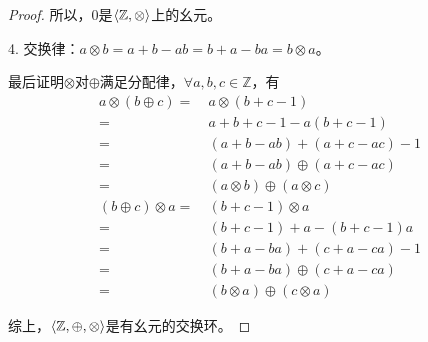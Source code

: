 \documentclass[12pt, a4paper, oneside]{ctexart}
\begin{document}
\begin{proof}
    所以，$0$是$\braket{\mathbb{Z},\otimes}$上的幺元。

    4. 交换律：$a\otimes b = a+b-ab = b+a-ba = b\otimes a$。

    最后证明$\otimes$对$\oplus$满足分配律，$\forall a,b, c\in \mathbb{Z}$，有
    \begin{equation*}
        \begin{aligned}
            a\otimes(b\oplus c) = &\ a\otimes(b+c-1)\\ 
            =&\ a+b+c-1-a(b+c-1)\\
            =&\ (a+b-ab)+(a+c-ac)-1\\
            =&\ (a+b-ab)\oplus(a+c-ac)\\
            =&\ (a\otimes b)\oplus(a\otimes c)
        \end{aligned}
    \end{equation*}
    \begin{equation*}
        \begin{aligned}
            (b\oplus c)\otimes a=\ &(b+c-1)\otimes a\\
            =\ &(b+c-1)+a-(b+c-1)a\\
            =\ &(b+a-ba)+(c+a-ca)-1\\
            =\ &(b+a-ba)\oplus(c+a-ca)\\
            =\ &(b\otimes a)\oplus(c\otimes a)
        \end{aligned}
    \end{equation*}

    综上，$\braket{\mathbb{Z},\oplus,\otimes}$是有幺元的交换环。

\end{proof}
\end{document}
